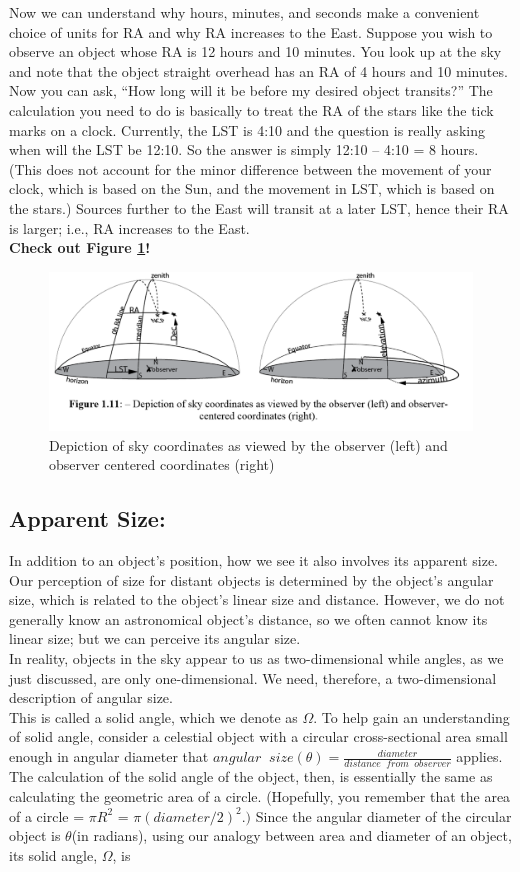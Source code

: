 \documentclass[10pt]{report}
\begin{document}
\begin{itemize}
Now we can understand why hours, minutes, and seconds make a convenient choice of units for RA and why RA increases to the East.  Suppose you wish to observe an object whose RA is 12 hours and 10 minutes.  You look up at the sky and note that the object straight overhead has an RA of 4 hours and 10 minutes.  Now you can ask, “How long will it be before my desired object transits?”  The calculation you need to do is basically to treat the RA of the stars like the tick marks on a clock.  Currently, the LST is 4:10 and the question is really asking when will the LST be 12:10.  So the answer is simply 12:10 – 4:10 = 8 hours.  (This does not account for the minor difference between the movement of your clock, which is based on the Sun, and the movement in LST, which is based on the stars.)  Sources further to the East will transit at a later LST, hence their RA is larger; i.e., RA increases to the East.\\
\textbf{Check out Figure \ref{figall}!}
\begin{figure}\label{figall}
\includegraphics[width=\linewidth]{figall.png}
\caption{ Depiction of sky coordinates as viewed by the observer (left) and observer centered coordinates (right)}
\end{figure} 
\subsection{Apparent Size:}
In addition to an object's position, how we see it also involves its apparent size.  Our perception of size for distant objects is determined by the object's angular size, which is related to the object's linear size and distance.  However, we do not generally know an astronomical object's distance, so we often cannot know its linear size; but we can perceive its angular size. \\
In reality, objects in the sky appear to us as two-dimensional while angles, as we just discussed, are only one-dimensional.  We need, therefore, a two-dimensional description of angular size.  \\
This is called a solid angle, which we denote as $\Omega$.  To help gain an understanding of solid angle, consider a celestial object with a circular cross-sectional area small enough in angular diameter that $angular \;\; size(\theta)=\frac{diameter}{distance\;\;from \;\;observer}$ applies.  The calculation of the solid angle of the object, then, is essentially the same as calculating the geometric area of a circle.  (Hopefully, you remember that the area of a circle = $\pi R^2$ = $\pi(diameter/2)^2.)$  Since the angular diameter of the circular object is $\theta$(in radians), using our analogy between area and diameter of an object, its solid angle, $\Omega$, is


\end{itemize}
\end{document}
